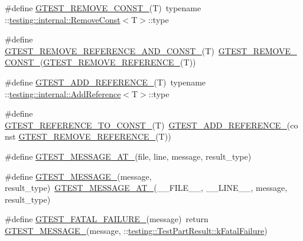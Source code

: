 \begin{DoxyCompactItemize}
\item 
\#define \hyperlink{gtest-internal_8h_a2ffec8c60510eb130af387f5ce9a756a}{\-G\-T\-E\-S\-T\-\_\-\-R\-E\-M\-O\-V\-E\-\_\-\-C\-O\-N\-S\-T\-\_\-}(\-T)~typename \-::\hyperlink{structtesting_1_1internal_1_1RemoveConst}{testing\-::internal\-::\-Remove\-Const}$<$\-T$>$\-::type
\item 
\#define \hyperlink{gtest-internal_8h_a874567b176266188fabfffb8393267ce}{\-G\-T\-E\-S\-T\-\_\-\-R\-E\-M\-O\-V\-E\-\_\-\-R\-E\-F\-E\-R\-E\-N\-C\-E\-\_\-\-A\-N\-D\-\_\-\-C\-O\-N\-S\-T\-\_\-}(\-T)~\hyperlink{gtest-internal_8h_a2ffec8c60510eb130af387f5ce9a756a}{\-G\-T\-E\-S\-T\-\_\-\-R\-E\-M\-O\-V\-E\-\_\-\-C\-O\-N\-S\-T\-\_\-}(\hyperlink{gtest-internal_8h_a84c72f25a6a6600e3ff8381ca6982ae9}{\-G\-T\-E\-S\-T\-\_\-\-R\-E\-M\-O\-V\-E\-\_\-\-R\-E\-F\-E\-R\-E\-N\-C\-E\-\_\-}(\-T))
\item 
\#define \hyperlink{gtest-internal_8h_ab389953fc1f7e4efae30d182a0e0a13b}{\-G\-T\-E\-S\-T\-\_\-\-A\-D\-D\-\_\-\-R\-E\-F\-E\-R\-E\-N\-C\-E\-\_\-}(\-T)~typename \-::\hyperlink{structtesting_1_1internal_1_1AddReference}{testing\-::internal\-::\-Add\-Reference}$<$\-T$>$\-::type
\item 
\#define \hyperlink{gtest-internal_8h_a9f91fcd24cae0b48fdaeb19102dac525}{\-G\-T\-E\-S\-T\-\_\-\-R\-E\-F\-E\-R\-E\-N\-C\-E\-\_\-\-T\-O\-\_\-\-C\-O\-N\-S\-T\-\_\-}(\-T)~\hyperlink{gtest-internal_8h_ab389953fc1f7e4efae30d182a0e0a13b}{\-G\-T\-E\-S\-T\-\_\-\-A\-D\-D\-\_\-\-R\-E\-F\-E\-R\-E\-N\-C\-E\-\_\-}(const \hyperlink{gtest-internal_8h_a84c72f25a6a6600e3ff8381ca6982ae9}{\-G\-T\-E\-S\-T\-\_\-\-R\-E\-M\-O\-V\-E\-\_\-\-R\-E\-F\-E\-R\-E\-N\-C\-E\-\_\-}(\-T))
\item 
\#define \hyperlink{gtest-internal_8h_a8d70025c45a47a493780746dfd66d565}{\-G\-T\-E\-S\-T\-\_\-\-M\-E\-S\-S\-A\-G\-E\-\_\-\-A\-T\-\_\-}(file, line, message, result\-\_\-type)
\item 
\#define \hyperlink{gtest-internal_8h_a94c73d5368ec946bc354d0992ad00810}{\-G\-T\-E\-S\-T\-\_\-\-M\-E\-S\-S\-A\-G\-E\-\_\-}(message, result\-\_\-type)~\hyperlink{gtest-internal_8h_a8d70025c45a47a493780746dfd66d565}{\-G\-T\-E\-S\-T\-\_\-\-M\-E\-S\-S\-A\-G\-E\-\_\-\-A\-T\-\_\-}(\-\_\-\-\_\-\-F\-I\-L\-E\-\_\-\-\_\-, \-\_\-\-\_\-\-L\-I\-N\-E\-\_\-\-\_\-, message, result\-\_\-type)
\item 
\#define \hyperlink{gtest-internal_8h_a0f9a4c3ea82cc7bf4478eaffdc168358}{\-G\-T\-E\-S\-T\-\_\-\-F\-A\-T\-A\-L\-\_\-\-F\-A\-I\-L\-U\-R\-E\-\_\-}(message)~return \hyperlink{gtest-internal_8h_a94c73d5368ec946bc354d0992ad00810}{\-G\-T\-E\-S\-T\-\_\-\-M\-E\-S\-S\-A\-G\-E\-\_\-}(message, \-::\hyperlink{classtesting_1_1TestPartResult_a1d1cfd8ffb84e947f82999c682b666a7a902a473edef7eeb3e0499901a220ecfd}{testing\-::\-Test\-Part\-Result\-::k\-Fatal\-Failure})

\end{DoxyCompactItemize}
